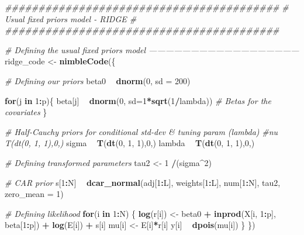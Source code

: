 \documentclass[]{article}
\newenvironment{Shaded}{\begin{snugshade}}{\end{snugshade}}
\newcommand{\CommentTok}[1]{\textcolor[rgb]{0.56,0.35,0.01}{\textit{#1}}}
\newcommand{\ControlFlowTok}[1]{\textcolor[rgb]{0.13,0.29,0.53}{\textbf{#1}}}
\newcommand{\DataTypeTok}[1]{\textcolor[rgb]{0.13,0.29,0.53}{#1}}
\newcommand{\DecValTok}[1]{\textcolor[rgb]{0.00,0.00,0.81}{#1}}
\newcommand{\KeywordTok}[1]{\textcolor[rgb]{0.13,0.29,0.53}{\textbf{#1}}}
\newcommand{\NormalTok}[1]{#1}
\newcommand{\OperatorTok}[1]{\textcolor[rgb]{0.81,0.36,0.00}{\textbf{#1}}}
\newcommand{\StringTok}[1]{\textcolor[rgb]{0.31,0.60,0.02}{#1}}
\begin{document}
\begin{Shaded}
\begin{Highlighting}[]
\CommentTok{#########################################}
\CommentTok{#    Usual fixed priors model - RIDGE     # }
\CommentTok{#########################################}

\CommentTok{# Defining the usual fixed priors model ------------------------------------------------------}
\NormalTok{ridge_code <-}\StringTok{ }\KeywordTok{nimbleCode}\NormalTok{(\{ }
  
  \CommentTok{# Defining our priors}
\NormalTok{  beta0 }\OperatorTok{~}\StringTok{ }\KeywordTok{dnorm}\NormalTok{(}\DecValTok{0}\NormalTok{, }\DataTypeTok{sd =} \DecValTok{200}\NormalTok{)}
  
  \ControlFlowTok{for}\NormalTok{(j }\ControlFlowTok{in} \DecValTok{1}\OperatorTok{:}\NormalTok{p)\{}
\NormalTok{    beta[j] }\OperatorTok{~}\StringTok{ }\KeywordTok{dnorm}\NormalTok{(}\DecValTok{0}\NormalTok{, }\DataTypeTok{sd=}\DecValTok{1}\OperatorTok{*}\KeywordTok{sqrt}\NormalTok{(}\DecValTok{1}\OperatorTok{/}\NormalTok{lambda))  }\CommentTok{# Betas for the covariates}
\NormalTok{  \}}
  
  \CommentTok{# Half-Cauchy priors for conditional std-dev & tuning param (lambda)}
  \CommentTok{#nu ~ T(dt(0, 1, 1),0,) }
\NormalTok{  sigma }\OperatorTok{~}\StringTok{ }\KeywordTok{T}\NormalTok{(}\KeywordTok{dt}\NormalTok{(}\DecValTok{0}\NormalTok{, }\DecValTok{1}\NormalTok{, }\DecValTok{1}\NormalTok{),}\DecValTok{0}\NormalTok{,) }
\NormalTok{  lambda }\OperatorTok{~}\StringTok{ }\KeywordTok{T}\NormalTok{(}\KeywordTok{dt}\NormalTok{(}\DecValTok{0}\NormalTok{, }\DecValTok{1}\NormalTok{, }\DecValTok{1}\NormalTok{),}\DecValTok{0}\NormalTok{,)}

  \CommentTok{# Defining transformed parameters}
\NormalTok{  tau2 <-}\StringTok{ }\DecValTok{1} \OperatorTok{/}\NormalTok{(sigma}\OperatorTok{^}\DecValTok{2}\NormalTok{)}
  
  \CommentTok{# CAR prior}
\NormalTok{  s[}\DecValTok{1}\OperatorTok{:}\NormalTok{N] }\OperatorTok{~}\StringTok{ }\KeywordTok{dcar_normal}\NormalTok{(adj[}\DecValTok{1}\OperatorTok{:}\NormalTok{L], weights[}\DecValTok{1}\OperatorTok{:}\NormalTok{L], num[}\DecValTok{1}\OperatorTok{:}\NormalTok{N], tau2, }\DataTypeTok{zero_mean =} \DecValTok{1}\NormalTok{)}
  
  \CommentTok{# Defining likelihood}
  \ControlFlowTok{for}\NormalTok{(i }\ControlFlowTok{in} \DecValTok{1}\OperatorTok{:}\NormalTok{N) \{ }
    \KeywordTok{log}\NormalTok{(r[i]) <-}\StringTok{ }\NormalTok{beta0 }\OperatorTok{+}\StringTok{ }\KeywordTok{inprod}\NormalTok{(X[i, }\DecValTok{1}\OperatorTok{:}\NormalTok{p], beta[}\DecValTok{1}\OperatorTok{:}\NormalTok{p]) }\OperatorTok{+}\StringTok{ }\KeywordTok{log}\NormalTok{(E[i]) }\OperatorTok{+}\StringTok{ }\NormalTok{s[i]}
\NormalTok{    mu[i] <-}\StringTok{ }\NormalTok{E[i]}\OperatorTok{*}\NormalTok{r[i]}
\NormalTok{    y[i] }\OperatorTok{~}\StringTok{ }\KeywordTok{dpois}\NormalTok{(mu[i])}
\NormalTok{  \}}
\NormalTok{\})}
\end{Highlighting}
\end{Shaded}
\end{document}
